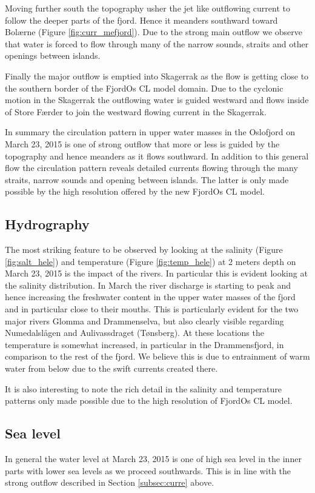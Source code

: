 Moving further south the topography usher the jet like outflowing current to follow the deeper parts of the fjord. Hence it meanders southward toward Bol{\ae}rne (Figure \ref{fig:curr_mefjord}). Due to the strong main outflow we observe that water is forced to flow through many of the narrow sounds, straits and other openings between islands.    
 

Finally the major outflow is emptied into Skagerrak as the flow is getting close to the southern border of the FjordOs CL model domain. Due to the cyclonic motion in the Skagerrak the outflowing water is guided westward and flows inside of Store F{\ae}rder to join the westward flowing current in the Skagerrak.    
  

In summary the circulation pattern in upper water masses in the Oslofjord on March 23, 2015 is one of strong outflow that more or less is guided by the topography and hence meanders as it flows southward. In addition to this general flow the circulation pattern reveals detailed currents flowing through the many straits, narrow sounds and opening between islands. The latter is only made possible by the high resolution offered by the new FjordOs CL model.

\clearpage
\subsection{Hydrography}
\label{subsec:hydro}
The most striking feature to be observed by looking at the salinity (Figure \ref{fig:salt_hele}) and temperature (Figure \ref{fig:temp_hele}) at 2 meters depth on March 23, 2015 is the impact of the rivers. In particular this is evident looking at the salinity distribution. In March the river discharge is starting to peak and hence increasing the freshwater content in the upper water masses of the fjord and in particular close to their mouths. This is particularly evident for the two major rivers Glomma and Drammenselva, but also clearly visible regarding Numedalsl{\aa}gen and Aulivassdraget (T{\o}nsberg). At these locations the temperature is somewhat increased, in particular in the Drammensfjord, in comparison to the rest of the fjord. We believe this is due to entrainment of warm water from below due to the swift currents created there.    
   
  

It is also interesting to note the rich detail in the salinity and temperature patterns only made possible due to the high resolution of FjordOs CL model. 

\clearpage
\subsection{Sea level}
\label{subsec:seale}
In general the water level at March 23, 2015 is one of high sea level in the inner parts with lower sea levels as we proceed southwards. This is in line with the strong outflow described in Section \ref{subsec:curre} above.
   
\clearpage